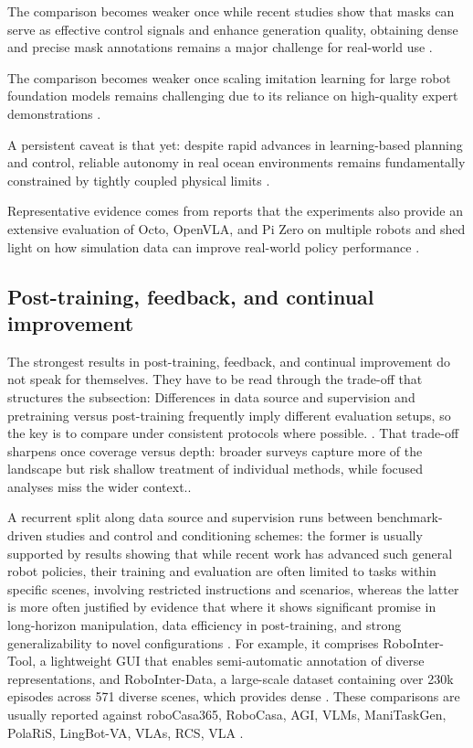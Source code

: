 \documentclass[a4paper,11pt]{article}
\begin{document}
The comparison becomes weaker once while recent studies show that masks can serve as effective control signals and enhance generation quality, obtaining dense and precise mask annotations remains a major challenge for real-world use \citep{Li2025Mask2Iv}.

The comparison becomes weaker once scaling imitation learning for large robot foundation models remains challenging due to its reliance on high-quality expert demonstrations \citep{Zhu2025Unified}.

A persistent caveat is that yet: despite rapid advances in learning-based planning and control, reliable autonomy in real ocean environments remains fundamentally constrained by tightly coupled physical limits \citep{Xu2026Underwater}.

Representative evidence comes from reports that the experiments also provide an extensive evaluation of Octo, OpenVLA, and Pi Zero on multiple robots and shed light on how simulation data can improve real-world policy performance \citep{Jlg2025Robot}.

\subsection{Post-training, feedback, and continual improvement}


The strongest results in post-training, feedback, and continual improvement do not speak for themselves. They have to be read through the trade-off that structures the subsection: Differences in data source and supervision and pretraining versus post-training frequently imply different evaluation setups, so the key is to compare under consistent protocols where possible. \citep{Pan2026Scalable,Ai2025Towards,Bai2025Embodied,Bai2025Towards}. That trade-off sharpens once coverage versus depth: broader surveys capture more of the landscape but risk shallow treatment of individual methods, while focused analyses miss the wider context..

A recurrent split along data source and supervision runs between benchmark-driven studies and control and conditioning schemes: the former is usually supported by results showing that while recent work has advanced such general robot policies, their training and evaluation are often limited to tasks within specific scenes, involving restricted instructions and scenarios, whereas the latter is more often justified by evidence that where it shows significant promise in long-horizon manipulation, data efficiency in post-training, and strong generalizability to novel configurations \citep{Dai2025Manitaskgen,Jain2025Polaris,Li2026Causal,Jlg2025Robot}. For example, it comprises RoboInter-Tool, a lightweight GUI that enables semi-automatic annotation of diverse representations, and RoboInter-Data, a large-scale dataset containing over 230k episodes across 571 diverse scenes, which provides dense \citep{Li2026Robointer}. These comparisons are usually reported against roboCasa365, RoboCasa, AGI, VLMs, ManiTaskGen, PolaRiS, LingBot-VA, VLAs, RCS, VLA \citep{Nasiriany2026Robocasa365,Dai2025Manitaskgen,Jain2025Polaris,Li2026Causal}.
\end{document}
